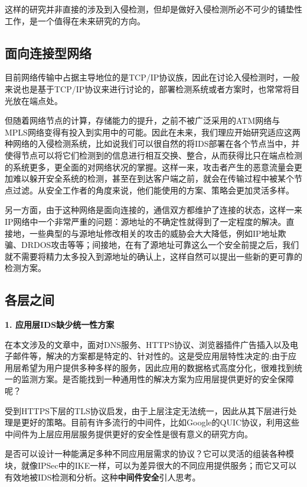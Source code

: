 \documentclass[12pt]{article} %
\begin{document}
这样的研究并非直接的涉及到入侵检测，但却是做好入侵检测所必不可少的铺垫性工作，是一个值得在未来研究的方向。

\subsection{面向连接型网络}
\label{connect}

目前网络传输中占据主导地位的是TCP/IP协议族，因此在讨论入侵检测时，一般来说也是基于TCP/IP协议来进行讨论的，部署检测系统或者方案时，也常常将目光放在端点处。

但随着网络节点的计算，存储能力的提升，之前不被广泛采用的ATM网络与MPLS网络变得有投入到实用中的可能。因此在未来，我们理应开始研究适应这两种网络的入侵检测系统，比如说我们可以很自然的将IDS部署在各个节点当中，并使得节点可以将它们检测到的信息进行相互交换、整合，从而获得比只在端点检测的系统更多，更全面的对网络状况的掌握。这样一来，攻击者产生的恶意流量会更加难以躲开安全系统的检测，甚至在到达客户端之前，就会在传输过程中被某个节点过滤。从安全工作者的角度来说，他们能使用的方案、策略会更加灵活多样。

另一方面，由于这种网络是面向连接的，通信双方都维护了连接的状态，这样一来IP网络中一个非常严重的问题：源地址的不确定性就得到了一定程度的解决。直接地，一些典型的与源地址修改相关的攻击的威胁会大大降低，例如IP地址欺骗、DRDOS攻击等等；间接地，在有了源地址可靠这么一个安全前提之后，我们就不需要将精力太多投入到源地址的确认上，这样自然可以提出一些新的更可靠的检测方案。


\subsection{各层之间}
\label{layer}

\textbf{1. 应用层IDS缺少统一性方案}

在本文涉及的文章中，面对DNS服务、HTTPS协议、浏览器插件广告插入以及电子邮件等，解决的方案都是特定的、针对性的。这是受应用层特性决定的:由于应用层希望为用户提供多种多样的服务，因此应用的数据格式高度分化，很难找到统一的监测方案。是否能找到一种通用性的解决方案为应用层提供更好的安全保障呢？

受到HTTPS下层的TLS协议启发，由于上层注定无法统一，因此从其下层进行处理是更好的策略。目前有许多流行的中间件，比如Google的QUIC协议，利用这些中间件为上层应用层服务提供更好的安全性是很有意义的研究方向。

是否可以设计一种能满足多种不同应用层需求的协议？它可以灵活的组装各种模块，就像IPSec中的IKE一样，可以为差异很大的不同应用提供服务；而它又可以有效地被IDS检测和分析。这种\textbf{中间件安全}引人思考。
\end{document}
